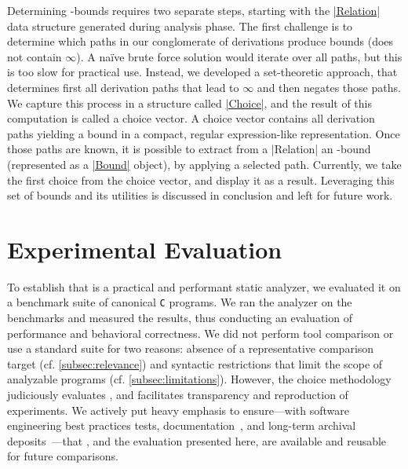 \documentclass[runningheads]{llncs}
\begin{document}
Determining \mwp-bounds requires two separate steps, starting with the \href{https://statycc.github.io/pymwp/relation}{\pr|Relation|} data structure generated during analysis phase.
The first challenge is to determine which paths in our conglomerate of derivations produce bounds (\ie does not contain \(\infty\)).
A naïve brute force solution would iterate over all paths, but this is too slow for practical use.
Instead, we developed a set-theoretic approach, that determines first all derivation paths that lead to $\infty$ and then negates those paths.
We capture this process in a structure called \href{https://statycc.github.io/pymwp/choice/}{\pr|Choice|}, and the result of this computation is called a choice vector.
A choice vector contains all derivation paths yielding a bound in a compact, regular expression-like representation.
Once those paths are known, it is possible to extract from a \pr|Relation| an \mwp-bound (represented as a \href{https://statycc.github.io/pymwp/bound/}{\pr|Bound|} object), by applying a selected path.
Currently, we take the first choice from the choice vector, and display it as a result.
Leveraging this set of bounds and its utilities is discussed in conclusion and left for future work.


\section{Experimental Evaluation}
\label{sec:eval} %

To establish that \pymwp is a practical and performant static analyzer, we evaluated it on a benchmark suite of canonical \texttt{C} programs.
We ran the analyzer on the benchmarks and measured the results, thus conducting an evaluation of performance and behavioral correctness.
We did not perform tool comparison or use a standard suite for two reasons:
absence of a representative comparison target (cf. \autoref{subsec:relevance})
and syntactic restrictions that limit the scope of analyzable programs (cf. \autoref{subsec:limitations}).
However, the choice methodology judiciously evaluates \pymwp, and facilitates transparency and reproduction of experiments.
We actively put heavy emphasis to ensure---with software engineering best practices \eg tests, documentation~\cite{pymwp_doc}, and long-term archival deposits~\cite{pymwp}---that \pymwp, and the evaluation presented here, are available and reusable for future comparisons.
\end{document}
